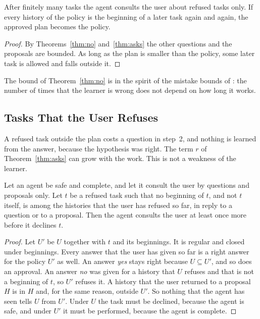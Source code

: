 \documentclass[acmsmall,nonacm,screen]{acmart}
\begin{document}
\begin{corollary}
\label{cor:limit}
After finitely many tasks the agent consults the user about refused tasks only. If every
history of the policy is the beginning of a later task again and again, the approved plan
becomes the policy.
\end{corollary}

\begin{proof}
By Theorems~\ref{thm:no} and~\ref{thm:asks} the other questions and the proposals are
bounded. As long as the plan is smaller than the policy, some later task is allowed and
falls outside it.
\end{proof}

The bound of Theorem~\ref{thm:no} is in the spirit of the mistake bounds of
\citet{littlestone1988}: the number of times that the learner is wrong does not depend on
how long it works.

\subsection{Tasks That the User Refuses}
\label{sec:refused}

A refused task outside the plan costs a question in step~2, and nothing is learned from the
answer, because the hypothesis was right. The term $r$ of Theorem~\ref{thm:asks} can grow
with the work. This is not a weakness of the learner.

\begin{proposition}
\label{prop:refusals}
Let an agent be safe and complete, and let it consult the user by questions and proposals
only. Let $t$ be a refused task such that no beginning of $t$, and not $t$ itself, is among
the histories that the user has refused so far, in reply to a question or to a proposal.
Then the agent consults the user at least once more before it declines $t$.
\end{proposition}

\begin{proof}
Let $U'$ be $U$ together with $t$ and its beginnings. It is regular and closed under
beginnings. Every answer that the user has given so far is a right answer for the policy $U'$
as well. An answer \emph{yes} stays right because $U \subseteq U'$, and so does an approval.
An answer \emph{no} was given for a history that $U$ refuses and that is not a beginning of
$t$, so $U'$ refuses it. A history that the user returned to a proposal $H$ is in $H$ and,
for the same reason, outside $U'$. So nothing that the agent has seen tells $U$ from $U'$.
Under $U$ the task must be declined, because the agent is safe, and under $U'$ it must be
performed, because the agent is complete.
\end{proof}
\end{document}
